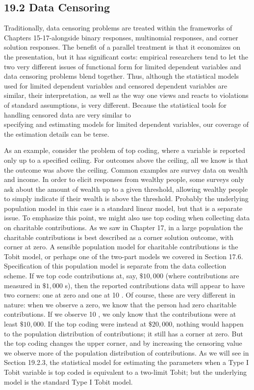 \documentclass[10pt]{article}
\begin{document}
\subsection*{19.2 Data Censoring}
Traditionally, data censoring problems are treated within the frameworks of Chapters 15-17-alongside binary responses, multinomial responses, and corner solution responses. The benefit of a parallel treatment is that it economizes on the presentation, but it has significant costs: empirical researchers tend to let the two very different issues of functional form for limited dependent variables and data censoring problems blend together. Thus, although the statistical models used for limited dependent variables and censored dependent variables are similar, their interpretation, as well as the way one views and reacts to violations of standard assumptions, is very different. Because the statistical tools for handling censored data are very similar to\\
specifying and estimating models for limited dependent variables, our coverage of the estimation details can be terse.

As an example, consider the problem of top coding, where a variable is reported only up to a specified ceiling. For outcomes above the ceiling, all we know is that the outcome was above the ceiling. Common examples are survey data on wealth and income. In order to elicit responses from wealthy people, some surveys only ask about the amount of wealth up to a given threshold, allowing wealthy people to simply indicate if their wealth is above the threshold. Probably the underlying population model in this case is a standard linear model, but that is a separate issue. To emphasize this point, we might also use top coding when collecting data on charitable contributions. As we saw in Chapter 17, in a large population the charitable contributions is best described as a corner solution outcome, with corner at zero. A sensible population model for charitable contributions is the Tobit model, or perhaps one of the two-part models we covered in Section 17.6. Specification of this population model is separate from the data collection scheme. If we top code contributions at, say, $\$ 10,000$ (where contributions are measured in $\$ 1,000$ s), then the reported contributions data will appear to have two corners: one at zero and one at 10 . Of course, these are very different in nature: when we observe a zero, we know that the person had zero charitable contributions. If we observe 10 , we only know that the contributions were at least $\$ 10,000$. If the top coding were instead at $\$ 20,000$, nothing would happen to the population distribution of contributions; it still has a corner at zero. But the top coding changes the upper corner, and by increasing the censoring value we observe more of the population distribution of contributions. As we will see in Section 19.2.3, the statistical model for estimating the parameters when a Type I Tobit variable is top coded is equivalent to a two-limit Tobit; but the underlying model is the standard Type I Tobit model.
\end{document}
